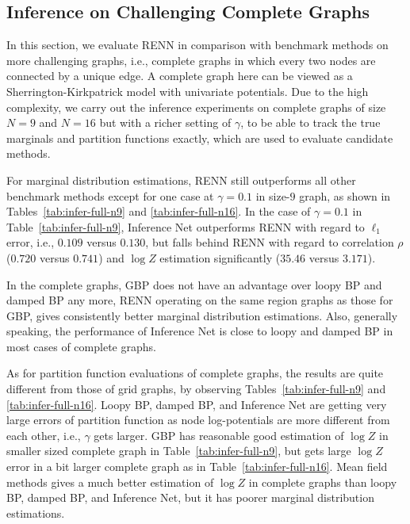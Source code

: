 \subsection{Inference on Challenging Complete Graphs}

In this section, we evaluate RENN in comparison with benchmark methods on more challenging graphs, i.e., complete graphs in which every two nodes are connected by a unique edge. A complete graph here can be viewed as a Sherrington-Kirkpatrick model \cite{PhysRevLett.35.1792} with univariate potentials. Due to the high complexity, we carry out the inference experiments on complete graphs of size $N=9$ and $N=16$ but with a richer setting of $\gamma$, to be able to track the true marginals and partition functions exactly, which are used to evaluate candidate methods.

For marginal distribution estimations, RENN still outperforms all other benchmark methods except for one case at $\gamma=0.1$ in size-$9$ graph, as shown in Tables~\ref{tab:infer-full-n9} and \ref{tab:infer-full-n16}. In the case of $\gamma=0.1$ in Table~\ref{tab:infer-full-n9}, Inference Net outperforms RENN with regard to $\ell_1$ error, i.e., $0.109$ versus $0.130$, but falls behind RENN with regard to correlation $\rho$ ($0.720$ versus $0.741$) and $\log{Z}$ estimation significantly ($35.46$ versus $3.171$).

In the complete graphs, GBP does not have an advantage over loopy BP and damped BP any more, RENN operating on the same region graphs as those for GBP, gives consistently better marginal distribution estimations. Also, generally speaking, the performance of Inference Net is close to loopy and damped BP in most cases of complete graphs.

As for partition function evaluations of complete graphs, the results are quite different from those of grid graphs, by observing Tables~\ref{tab:infer-full-n9} and \ref{tab:infer-full-n16}. Loopy BP, damped BP, and Inference Net are getting very large errors of partition function as node log-potentials are more different from each other, i.e., $\gamma$ gets larger. GBP has reasonable good estimation of $\log{Z}$ in smaller sized complete graph in Table~\ref{tab:infer-full-n9}, but gets large $\log{Z}$ error in a bit larger complete graph as in Table~\ref{tab:infer-full-n16}. Mean field methods gives a much better estimation of $\log{Z}$ in complete graphs than loopy BP, damped BP, and Inference Net, but it has poorer marginal distribution estimations.


